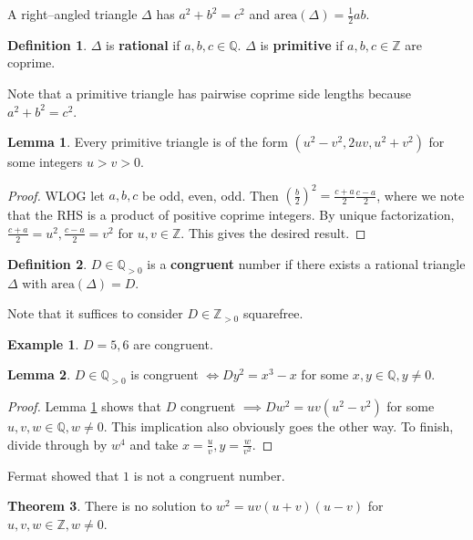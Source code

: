 \documentclass{article}
\theoremstyle{definition}
\newtheorem{theorem}{Theorem}[section]
\newtheorem{lemma}[theorem]{Lemma}
\newtheorem{example}{Example}[section]
\newtheorem{defn}{Definition}[section]
\begin{document}
A right--angled triangle $\Delta$ has $a^2+b^2=c^2$ and $\text{area}(\Delta) = \frac{1}{2}ab$.
\begin{defn}
    $\Delta$ is \textbf{rational} if $a,b,c \in \mathbb{Q}$. $\Delta$ is \textbf{primitive} if $a,b,c \in \mathbb{Z}$ are coprime.
\end{defn}
Note that a primitive triangle has pairwise coprime side lengths because $a^2+b^2=c^2$.
\begin{lemma}\label{lemma1.1}
    Every primitive triangle is of the form $(u^2-v^2, 2uv, u^2+v^2)$ for some integers $u > v > 0$.
\end{lemma}
\begin{proof}
    WLOG let $a,b,c$ be odd, even, odd. Then $\left(\frac{b}{2}\right)^2 = \frac{c+a}{2}\frac{c-a}{2}$, where we note that the RHS is a product of positive coprime integers. By unique factorization, $\frac{c+a}{2} = u^2, \frac{c-a}{2}=v^2$ for $u,v \in \mathbb{Z}$. This gives the desired result.
\end{proof}
\begin{defn}
    $D \in \mathbb{Q}_{>0}$ is a \textbf{congruent} number if there exists a rational triangle $\Delta$ with $\text{area}(\Delta)=D$.
\end{defn}
Note that it suffices to consider $D \in \mathbb{Z}_{> 0}$ squarefree.
\begin{example}
    $D=5,6$ are congruent.
\end{example} 
\begin{lemma}\label{lemma1.2}
    $D \in \mathbb{Q}_{>0}$ is congruent $\iff Dy^2 = x^3-x$ for some ${x,y \in \mathbb{Q}, y \neq 0}$.
\end{lemma}
\begin{proof}
    Lemma \ref{lemma1.1} shows that $D$ congruent $\implies Dw^2 = uv(u^2-v^2)$ for some $u,v,w \in \mathbb{Q}, w \neq 0$. This implication also obviously goes the other way. To finish, divide through by $w^4$ and take $x = \frac{u}{v}, y = \frac{w}{v^2}$.
\end{proof}
Fermat showed that $1$ is not a congruent number.
\begin{theorem}\label{theorem1.3}
    There is no solution to $w^2 = uv(u+v)(u-v)$ for $u,v,w \in \mathbb{Z}, w \neq 0$.
\end{theorem}
\end{document}
